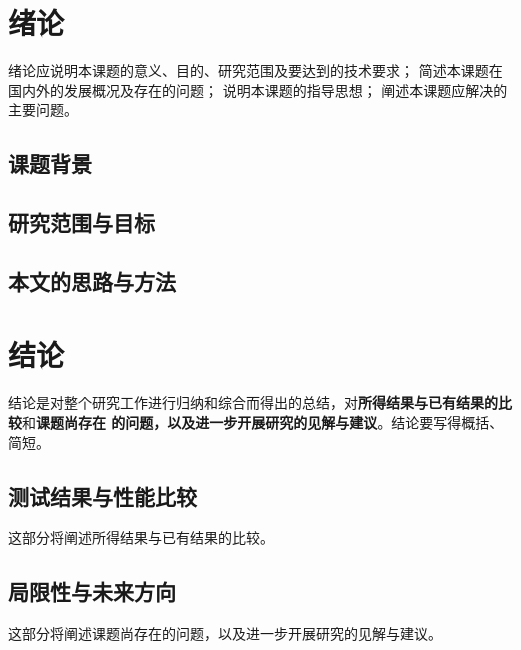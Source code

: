 \section{绪论}
绪论应说明本课题的意义、目的、研究范围及要达到的技术要求；
简述本课题在国内外的发展概况及存在的问题；
说明本课题的指导思想；
阐述本课题应解决的主要问题。

\subsection{课题背景}

\subsection{研究范围与目标}

\subsection{本文的思路与方法}


\section{结论}
结论是对整个研究工作进行归纳和综合而得出的总结，对\textbf{所得结果与已有结果的比较}和\textbf{课题尚存在
的问题，以及进一步开展研究的见解与建议}。结论要写得概括、简短。
\subsection{测试结果与性能比较}
这部分将阐述所得结果与已有结果的比较。
\subsection{局限性与未来方向}
这部分将阐述课题尚存在的问题，以及进一步开展研究的见解与建议。
